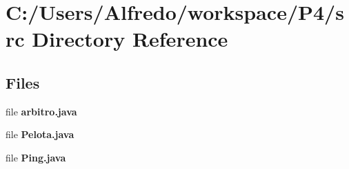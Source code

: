 \section{C\+:/\+Users/\+Alfredo/workspace/\+P4/src Directory Reference}
\label{dir_5c128a0b5c362d782f2fd5ee963f78f6}
\subsection*{Files}
\begin{DoxyCompactItemize}
\item 
file {\bf arbitro.\+java}
\item 
file {\bf Pelota.\+java}
\item 
file {\bf Ping.\+java}
\end{DoxyCompactItemize}
